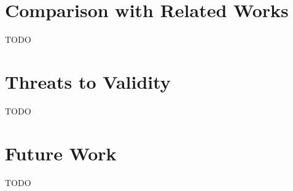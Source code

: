 \section{Comparison with Related Works}

TODO

\section{Threats to Validity}

TODO

\section{Future Work}

TODO